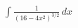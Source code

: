 \documentclass[preview]{standalone}
\begin{document}
\begin{align*}
\int \frac{1}{(16-4x^2)^{3/2}} \, dx
\end{align*}
\end{document}
